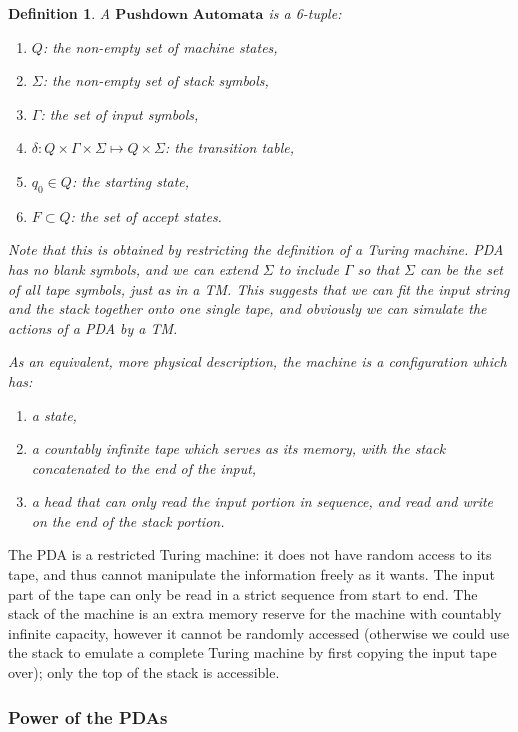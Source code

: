 \documentclass[12pt]{article}  %
\newtheorem{definition}{Definition}
\begin{document}
\begin{definition}
A $\textbf{Pushdown Automata}$ is a 6-tuple:
\begin{enumerate}
	\item $Q$: the non-empty set of machine states,
	\item $\Sigma$: the non-empty set of stack symbols,
	\item $\Gamma$: the set of input symbols,
	\item $\delta: Q \times \Gamma \times \Sigma \mapsto Q \times \Sigma $: the transition table,
	\item $q_0 \in Q$: the starting state,
	\item $F \subset Q$: the set of accept states.
\end{enumerate}

Note that this is obtained by restricting the definition of a Turing machine. PDA has no blank symbols, and we can extend $\Sigma$ to include $\Gamma$ so that $\Sigma$ can be the set of all tape symbols, just as in a TM. This suggests that we can fit the input string and the stack together onto one single tape, and obviously we can simulate the actions of a PDA by a TM.

As an equivalent, more physical description, the machine is a configuration which has:
\begin{enumerate}
	\item a state,
	\item a countably infinite tape which serves as its memory, with the stack concatenated to the end of the input,
	\item a head that can only read the input portion in sequence, and read and write on the end of the stack portion.
\end{enumerate}
\end{definition}



The PDA is a restricted Turing machine: it does not have random access to its tape, and thus cannot manipulate the information freely as it wants. The input part of the tape can only be read in a strict sequence from start to end. The stack of the machine is an extra memory reserve for the machine with countably infinite capacity, however it cannot be randomly accessed (otherwise we could use the stack to emulate a complete Turing machine by first copying the input tape over); only the top of the stack is accessible.




\subsubsection{Power of the PDAs}
\end{document}

